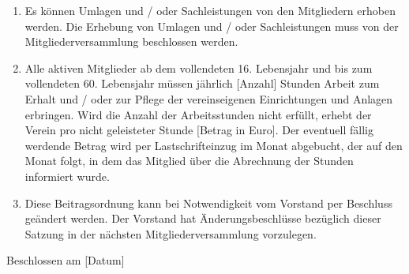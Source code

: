 \documentclass[a4paper,ngerman]{scrartcl}
\begin{document}
\begin{enumerate}
\item Es können Umlagen und / oder Sachleistungen von den Mitgliedern erhoben werden. Die Erhebung von Umlagen und / oder Sachleistungen muss von der Mitgliederversammlung beschlossen werden.
\item Alle aktiven Mitglieder ab dem vollendeten 16. Lebensjahr und bis zum vollendeten 60. Lebensjahr müssen jährlich [Anzahl] Stunden Arbeit zum Erhalt und / oder zur Pflege der vereinseigenen Einrichtungen und Anlagen erbringen. Wird die Anzahl der Arbeitsstunden nicht erfüllt, erhebt der Verein pro nicht geleisteter Stunde [Betrag in Euro]. Der eventuell fällig werdende Betrag wird per Lastschrifteinzug im Monat abgebucht, der auf den Monat folgt, in dem das Mitglied über die Abrechnung der Stunden informiert wurde.
\item Diese Beitragsordnung kann bei Notwendigkeit vom Vorstand per Beschluss geändert werden. Der Vorstand hat Änderungsbeschlüsse bezüglich dieser Satzung in der nächsten Mitgliederversammlung vorzulegen.
\end{enumerate}


Beschlossen am [Datum]
\end{document}
